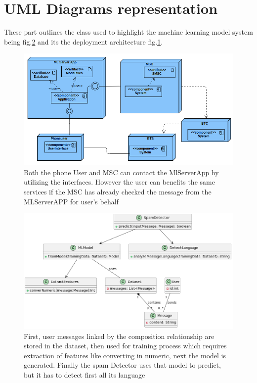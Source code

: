 \documentclass[12pt,a4paper, oneside]{book}
\begin{document}
\section{UML Diagrams representation} 
These part outlines the class used to highlight the machine learning model system being fig.\ref{fig:diaclass} and its the deployment architecture fig.\ref{fig:deploymentuml}.
\begin{figure}[h]
	\centering
	\includegraphics[width=1\linewidth]{Images/deploymentUMl}
	\caption[Deployment architecture in UML.]{ Both the phone User and MSC can contact the MlServerApp by utilizing the interfaces. However the user can benefits the same services if the MSC has already checked the message from the MLServerAPP for user's behalf }
	\label{fig:deploymentuml}
\end{figure}

\begin{figure}[h]
	\centering
	\includegraphics[width=1\linewidth]{Images/diaClass}
	\caption[Class diagram of the ML]{First, user messages linked by the composition relationship are stored in the dataset, then used for training process which requires extraction of features like converting in numeric, next the model is generated. Finally the spam Detector uses that model to predict, but it has to detect first all its language}
	\label{fig:diaclass}
\end{figure}
\end{document}
